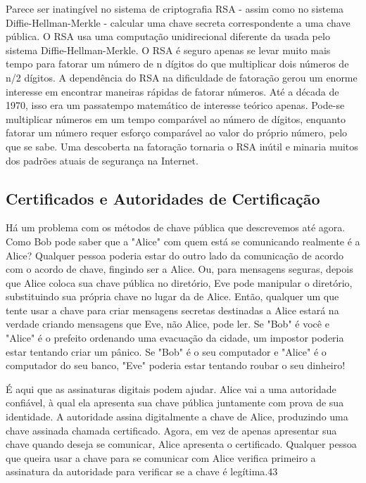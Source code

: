 \documentclass{book}
\begin{document}
Parece ser inatingível no sistema de criptografia RSA - assim como no sistema Diffie-Hellman-Merkle - calcular uma chave secreta correspondente a uma chave pública. O RSA usa uma computação unidirecional diferente da usada pelo sistema Diffie-Hellman-Merkle. O RSA é seguro apenas se levar muito mais tempo para fatorar um número de n dígitos do que multiplicar dois números de n/2 dígitos. A dependência do RSA na dificuldade de fatoração gerou um enorme interesse em encontrar maneiras rápidas de fatorar números. Até a década de 1970, isso era um passatempo matemático de interesse teórico apenas. Pode-se multiplicar números em um tempo comparável ao número de dígitos, enquanto fatorar um número requer esforço comparável ao valor do próprio número, pelo que se sabe. Uma descoberta na fatoração tornaria o RSA inútil e minaria muitos dos padrões atuais de segurança na Internet.


\subsection{Certificados e Autoridades de Certificação}
\label{}

Há um problema com os métodos de chave pública que descrevemos até agora. Como Bob pode saber que a "Alice" com quem está se comunicando realmente é a Alice? Qualquer pessoa poderia estar do outro lado da comunicação de acordo com o acordo de chave, fingindo ser a Alice. Ou, para mensagens seguras, depois que Alice coloca sua chave pública no diretório, Eve pode manipular o diretório, substituindo sua própria chave no lugar da de Alice. Então, qualquer um que tente usar a chave para criar mensagens secretas destinadas a Alice estará na verdade criando mensagens que Eve, não Alice, pode ler. Se "Bob" é você e "Alice" é o prefeito ordenando uma evacuação da cidade, um impostor poderia estar tentando criar um pânico. Se "Bob" é o seu computador e "Alice" é o computador do seu banco, "Eve" poderia estar tentando roubar o seu dinheiro!

É aqui que as assinaturas digitais podem ajudar. Alice vai a uma autoridade confiável, à qual ela apresenta sua chave pública juntamente com prova de sua identidade. A autoridade assina digitalmente a chave de Alice, produzindo uma chave assinada chamada certificado. Agora, em vez de apenas apresentar sua chave quando deseja se comunicar, Alice apresenta o certificado. Qualquer pessoa que queira usar a chave para se comunicar com Alice verifica primeiro a assinatura da autoridade para verificar se a chave é legítima.43
\end{document}
